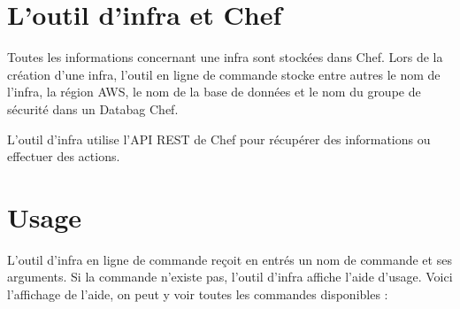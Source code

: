 \section{L'outil d'infra et Chef}

Toutes les informations concernant une infra sont stockées dans Chef.
Lors de la création d'une infra, l'outil en ligne de commande stocke entre
autres le nom de l'infra, la région AWS, le nom de la base de données et le nom
du groupe de sécurité dans un Databag Chef.

L'outil d'infra utilise l'API REST de Chef pour récupérer des informations ou
effectuer des actions.

\section{Usage}

L'outil d'infra en ligne de commande reçoit en entrés un nom de commande
et ses arguments. Si la commande n'existe pas, l'outil d'infra affiche l'aide
d'usage.
Voici l'affichage de l'aide, on peut y voir toutes les commandes disponibles :



